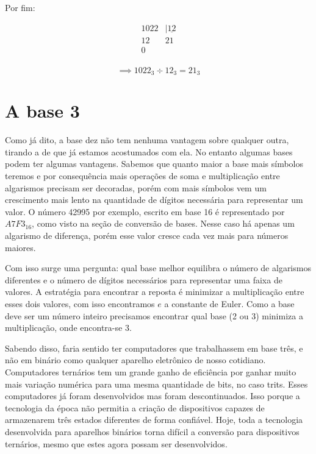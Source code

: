 \documentclass{report}
\theoremstyle{definition}
\begin{document}
Por fim:

\[
    \begin{array}{rr}
        1022& |\underline{12}\\
          12&              21\\
           0&                \\
    \end{array}
\]

\begin{equation*}
\implies 1022_3 \div 12_3 = 21_3
\end{equation*}

\section{A base 3}

Como já dito, a base dez não tem nenhuma vantagem sobre qualquer outra, tirando a de que já estamos acostumados com ela. No entanto algumas bases podem ter algumas vantagens. Sabemos que quanto maior a base mais símbolos teremos e por consequência mais operações de soma e multiplicação entre algarismos precisam ser decoradas, porém com mais símbolos vem um crescimento mais lento na quantidade de dígitos necessária para representar um valor. O número 42995 por exemplo, escrito em base 16 é representado por $A7F3_{16}$, como visto na seção de conversão de bases. Nesse caso há apenas um algarismo de diferença, porém esse valor cresce cada vez mais para números maiores.

Com isso surge uma pergunta: qual base melhor equilibra o número de algarismos diferentes e o número de dígitos necessários para representar uma faixa de valores. A estratégia para encontrar a reposta é minimizar a multiplicação entre esses dois valores, com isso encontramos $e$ a constante de Euler. Como a base deve ser um número inteiro precisamos encontrar qual base (2 ou 3) minimiza a multiplicação, onde encontra-se 3.

Sabendo disso, faria sentido ter computadores que trabalhassem em base três, e não em binário como qualquer aparelho eletrônico de nosso cotidiano. Computadores ternários tem um grande ganho de eficiência por ganhar muito mais variação numérica para uma mesma quantidade de bits, no caso trits. Esses computadores já foram desenvolvidos mas foram descontinuados. Isso porque a tecnologia da época não permitia a criação de dispositivos capazes de armazenarem três estados diferentes de forma confiável. Hoje, toda a tecnologia desenvolvida para aparelhos binários torna difícil a conversão para dispositivos ternários, mesmo que estes agora possam ser desenvolvidos.
\end{document}
